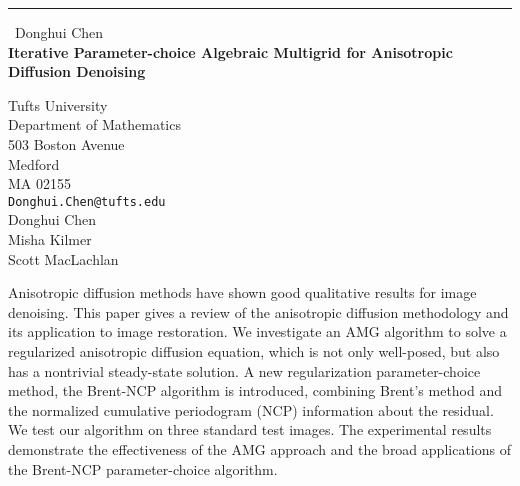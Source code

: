 \documentclass{report}
\begin{document}
\begin{center}
\rule{6in}{1pt} \
{\large Donghui Chen \\
{\bf Iterative Parameter-choice Algebraic Multigrid for Anisotropic Diffusion Denoising}}

Tufts University \\ Department of Mathematics \\ 503 Boston Avenue \\ Medford \\ MA 02155
\\
{\tt Donghui.Chen@tufts.edu}\\
Donghui Chen\\
Misha Kilmer\\
Scott MacLachlan\end{center}

Anisotropic diffusion methods have shown good qualitative results for
image denoising. This paper gives a review of the anisotropic diffusion
methodology and its application to image restoration. We investigate an
AMG algorithm to solve a regularized anisotropic diffusion equation,
which is not only well-posed, but also has a nontrivial steady-state
solution. A new regularization parameter-choice method, the Brent-NCP
algorithm is introduced, combining Brent's method and the normalized
cumulative periodogram (NCP) information about the residual. We test our
algorithm on three standard test images. The experimental results
demonstrate the effectiveness of the AMG approach and the broad
applications of the Brent-NCP parameter-choice algorithm.
\end{document}

